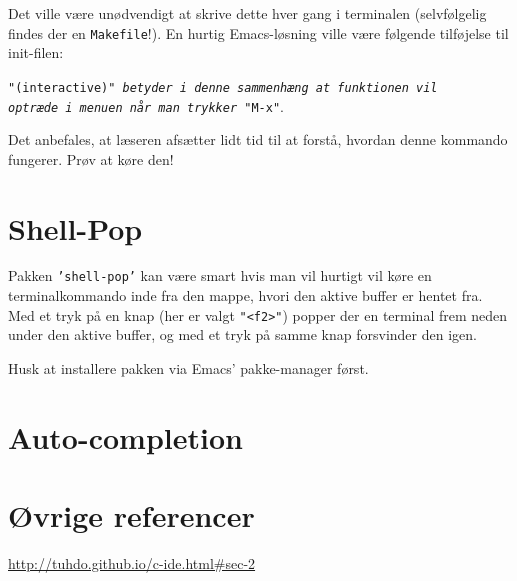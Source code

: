 \documentclass[a4paper, 9pt]{article}
\newcommand{\key}[1]{\texttt{"#1"}}
\newcommand{\package}[1]{\texttt{'#1'}}
\newcommand{\lstline}{\vspace{-3mm}\hrulefill\vspace{2mm}\newline}
\newcommand{\customlisting}[3]{\lstline}
\begin{document}
\noindent
Det ville være unødvendigt at skrive dette hver gang i terminalen (selvfølgelig findes der en \texttt{Makefile}!). En hurtig Emacs-løsning ville være følgende tilføjelse til init-filen:

\customlisting{ELisp}{init.el}{my-compile-function.el}

\vspace{-7mm}\begin{center}\footnotesize\texttt{"(interactive)" \textit{betyder i denne sammenhæng at funktionen vil\\ optræde i menuen når man trykker} \key{M-x}}.\end{center}


Det anbefales, at læseren afsætter lidt tid til at forstå, hvordan denne kommando fungerer. Prøv at køre den!


\newpage
\section{Shell-Pop}
Pakken \package{shell-pop} kan være smart hvis man vil hurtigt vil køre en terminalkommando inde fra den mappe, hvori den aktive buffer er hentet fra. Med et tryk på en knap (her er valgt \key{<f2>}) popper der en terminal frem neden under den aktive buffer, og med et tryk på samme knap forsvinder den igen.

\customlisting{ELisp}{init.el}{shell-pop.el}

\noindent
Husk at installere pakken via Emacs' pakke-manager først.

\newpage
\section{Auto-completion}



\newpage
\section{Øvrige referencer}
\url{http://tuhdo.github.io/c-ide.html#sec-2}
\end{document}
